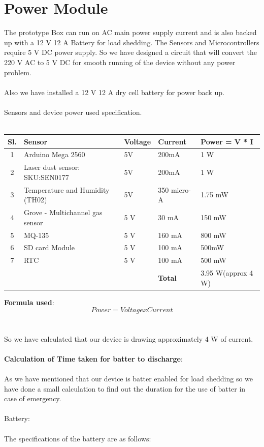 \section{Power Module}
The prototype Box can run on AC main power supply current and is also backed up with a 12 V 12 A Battery for load shedding. The Sensors and Microcontrollers require 5 V DC power supply. So we have designed a circuit that will convert the 220 V AC to 5 V DC for smooth running of the device without any power problem.
\\
\\
Also we have installed a 12 V 12 A dry cell battery for power back up.
\\
\\
Sensors and device power used specification.
\\
\\
\begin{center}
 \begin{tabular}{| c |  p{4cm} | p{3cm} | p{3cm} | p{3cm} |} 
\hline
 Sl. & Sensor & Voltage & Current & Power = V * I \\ [0.5ex] 
 \hline\hline
 1 & Arduino Mega 2560 & 5V & 200mA & 1 W \\ 
 \hline
 2 & Laser dust sensor: SKU:SEN0177 & 5V & 200mA & 1 W \\
 \hline
 3 & Temperature and Humidity (TH02) & 5V & 350 micro-A & 1.75 mW \\
 \hline
 4 & Grove - Multichannel gas sensor & 5 V & 30 mA & 150 mW \\
 \hline
 5 & MQ-135 & 5 V & 160 mA & 800 mW \\
 \hline
6 & SD card Module & 5 V & 100 mA & 500mW \\
 \hline
7 & RTC & 5 V & 100 mA & 500 mW \\
 \hline
  &   &   &  \textbf{Total} & 3.95 W(approx 4 W) \\
 \hline
\end{tabular}
\end{center}

\textbf{Formula used}: $$Power = Voltage x Current$$
\\
\\
So we have calculated that our device is drawing approximately 4 W of current.
\\
\\
\textbf{Calculation of Time taken for batter to discharge}:
\\
\\
As we have mentioned that our device is batter enabled for load shedding so we have done a small calculation to find out the duration for the use of batter in case of emergency.
\\
\\
Battery:
\\
\\ 
The specifications of the battery are as follows: 

